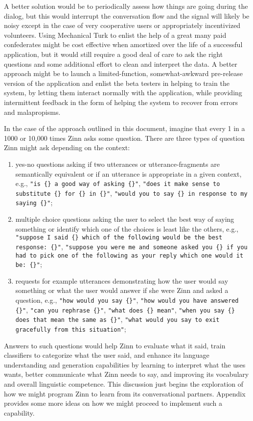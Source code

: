 \documentclass[letterpaper,12pt]{article}
\begin{document}
A better solution would be to periodically assess how things are going during the dialog, but this would interrupt the conversation flow and the signal will likely be noisy except in the case of very cooperative users or appropriately incentivized volunteers. Using Mechanical Turk to enlist the help of a great many paid confederates might be cost effective when amortized over the life of a successful application, but it would still require a good deal of care to ask the right questions and some additional effort to clean and interpret the data.  A better approach might be to launch a limited-function, somewhat-awkward pre-release version of the application and enlist the beta testers in helping to train the system, by letting them interact normally with the application, while providing intermittent feedback in the form of helping the system to recover from errors and malapropisms. 

In the case of the approach outlined in this document, imagine that every 1 in a 1000 or 10,000 times Zinn asks some question. There are three types of question Zinn might ask depending on the context:
%
\begin{enumerate}
%
\item yes-no questions asking if two utterances or utterance-fragments are semantically equivalent or if an utterance is appropriate in a given context, e.g., {\tt{"is \{\} a good way of asking \{\}"}}, {\tt{"does it make sense to substitute \{\} for \{\} in \{\}"}},  {\tt{"would you to say \{\} in response to my saying \{\}"}};
%
\item multiple choice questions asking the user to select the best way of saying something or identify which one of the choices is least like the others, e.g., {\tt{"suppose I said \{\} which of the following would be the best response: \{\}"}}, {\tt{"suppose you were me and someone asked you \{\} if you had to pick one of the following as your reply which one would it be: \{\}"}};
%
\item requests for example utterances demonstrating how the user would say something or what the user would answer if she were Zinn and asked a question, e.g., {\tt{"how would you say \{\}"}}, {\tt{"how would you have answered \{\}"}}, {\tt{"can you rephrase \{\}"}}, {\tt{"what does \{\} mean"}}, {\tt{"when you say \{\} does that mean the same as \{\}"}}, {\tt{"what would you say to exit gracefully from this situation"}};
%
\end{enumerate}
%
Answers to such questions would help Zinn to evaluate what it said, train classifiers to categorize what the user said, and enhance its language understanding and generation capabilities by learning to interpret what the uses wants, better communicate what Zinn needs to say, and improving its vocabulary and overall linguistic competence. This discussion just begins the exploration of how we might program Zinn to learn from its conversational partners. Appendix~ provides some more ideas on how we might proceed to implement such a capability.
\end{document}
